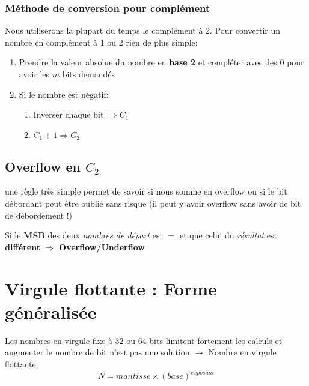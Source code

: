\subsubsection{Méthode de conversion pour complément}
Nous utiliserons la plupart du temps le complément à 2. Pour convertir un nombre en complément à 1 ou 2 rien de plus simple: 
\begin{enumerate}
	\item Prendre la valeur absolue du nombre en \textbf{base 2} et compléter avec des 0 pour avoir les $m$ bits demandés
	\item Si le nombre est négatif: 
	\begin{enumerate}
		\item Inverser chaque bit $\Rightarrow C_1$
		\item $C_1+1\Rightarrow C_2$
	\end{enumerate}
\end{enumerate}
\subsection{Overflow en $C_2$}
une règle très simple permet de savoir si nous somme en overflow ou si le bit débordant peut être oublié sans risque (il peut y avoir overflow sans avoir de bit de débordement !)
\begin{center}
	Si le \textbf{MSB} des deux \textit{nombres de départ} est $\pmb{=}$ et que celui du \textit{résultat} est \textbf{différent} $\Rightarrow$ \textbf{Overflow/Underflow}
\end{center}
\section{Virgule flottante : Forme généralisée}
Les nombres en virgule fixe à 32 ou 64 bits limitent fortement les calculs et augmenter le nombre de bit n'est pas une solution $\rightarrow$ Nombre en virgule flottante:
\begin{equation}
N=mantisse\times(base)^{exposant}
\end{equation}
